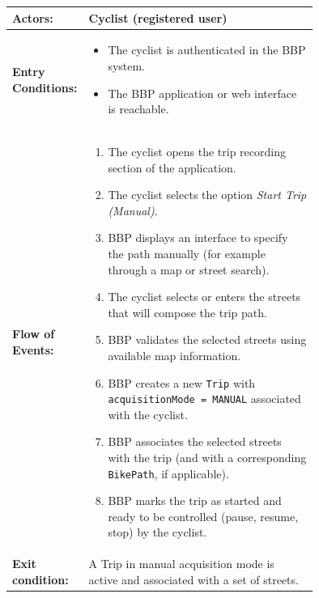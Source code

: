 \begin{center}
\begin{longtable}{|l|p{0.75\linewidth}|}
    \hline
    \textbf{Actors:}           
    & Cyclist (registered user)                                                          \\
    \hline

    \textbf{Entry Conditions:} 
    & \begin{itemize}
          \item The cyclist is authenticated in the BBP system.
          \item The BBP application or web interface is reachable.
       \end{itemize}                                                                      \\
    \hline

    \textbf{Flow of Events:}   
    & \begin{enumerate}
          \item The cyclist opens the trip recording section of the application.
          \item The cyclist selects the option \emph{Start Trip (Manual)}.
          \item BBP displays an interface to specify the path manually (for example through a map or street search).
          \item The cyclist selects or enters the streets that will compose the trip path.
          \item BBP validates the selected streets using available map information.
          \item BBP creates a new \texttt{Trip} with \texttt{acquisitionMode = MANUAL} associated with the cyclist.
          \item BBP associates the selected streets with the trip (and with a corresponding \texttt{BikePath}, if applicable).
          \item BBP marks the trip as started and ready to be controlled (pause, resume, stop) by the cyclist.
       \end{enumerate}                                                                    \\
    \hline

    \textbf{Exit condition:}   
    & A Trip in manual acquisition mode is active and associated with a set of streets.  \\
    \hline


\end{longtable}
\end{center}
